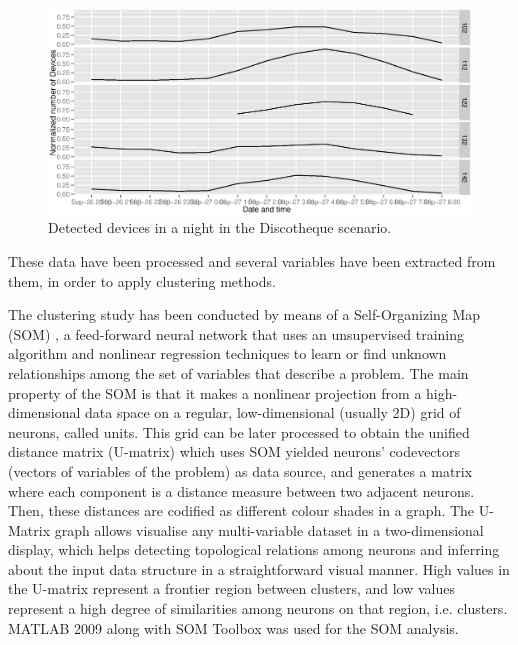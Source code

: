 \documentclass[preprint]{elsarticle}
\begin{document}
\begin{figure}[ht]
	\begin{center}
		\includegraphics[width=\textwidth]{imgs/DISCO/time_series-linesPoints.eps}
		\caption{Detected devices in a night in the Discotheque scenario.}
		\label{fig:disco_data}
	\end{center}
\end{figure}

These data have been processed and several variables have been
extracted from them, in order to apply clustering methods. %

The clustering study has been conducted by means of a Self-Organizing
Map (SOM) \cite{Kohonen90}, a feed-forward neural network
\cite{NN_Haykin94} that uses an unsupervised training algorithm and
nonlinear regression techniques to learn or find unknown relationships
among the set of variables that describe a problem. The main property
of the SOM is that it makes a nonlinear projection from a
high-dimensional data space on a regular, low-dimensional (usually 2D)
grid of neurons, called units. This grid can be later processed to
obtain the unified distance matrix (U-matrix) \cite{UmatUlts} which
uses SOM yielded neurons' codevectors (vectors of variables of the
problem) as data source, and generates a matrix where each component
is a distance measure between two adjacent neurons. Then, these
distances are codified as different colour shades in a graph. 
The U-Matrix graph allows visualise any multi-variable dataset in a two-dimensional display, which helps detecting topological relations among neurons and inferring about the input data structure in a straightforward visual manner. High values in the U-matrix represent a frontier region between clusters, and low values represent a high degree of similarities among neurons on that region, i.e. clusters. MATLAB 2009 along with SOM Toolbox \cite{SOMPAK} was used for the SOM analysis.
\end{document}
